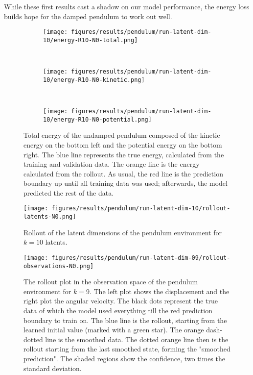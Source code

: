 		While these first results cast a shadow on our model performance, the energy loss builds hope for the damped pendulum to work out well.

		\begin{figure}
			\centering
			\begin{subfigure}{0.7\linewidth}
				\texttt{[image: figures/results/pendulum/run-latent-dim-10/energy-R10-N0-total.png]}
			\end{subfigure} \\
			\begin{subfigure}{0.5\linewidth}
				\centering
				\texttt{[image: figures/results/pendulum/run-latent-dim-10/energy-R10-N0-kinetic.png]}
			\end{subfigure}%
			~
			\begin{subfigure}{0.5\linewidth}
				\centering
				\texttt{[image: figures/results/pendulum/run-latent-dim-10/energy-R10-N0-potential.png]}
			\end{subfigure}
			\caption[Total energy of the undamped pendulum]{Total energy of the undamped pendulum composed of the kinetic energy on the bottom left and the potential energy on the bottom right. The blue line represents the true energy, calculated from the training and validation data. The orange line is the energy calculated from the rollout. As usual, the red line is the prediction boundary up until all training data was used; afterwards, the model predicted the rest of the data.}
			\label{fig:pendulumEnergyL10}
		\end{figure}

		\begin{figure}
			\centering
			\texttt{[image: figures/results/pendulum/run-latent-dim-10/rollout-latents-N0.png]}
			\caption[Latent rollout of the pendulum experiment for 10 latent dimensions]{Rollout of the latent dimensions of the pendulum environment for \(k = 10 \) latents.}
			\label{fig:pendulumLatentRolloutL10}
		\end{figure}

		\begin{figure}
			\centering
			\texttt{[image: figures/results/pendulum/run-latent-dim-09/rollout-observations-N0.png]}
			\caption[Rollout of the pendulum experiment for 9 latent dimensions]{The rollout plot in the observation space of the pendulum environment for \(k = 9\). The left plot shows the displacement and the right plot the angular velocity. The black dots represent the true data of which the model used everything till the red prediction boundary to train on. The blue line is the rollout, starting from the learned initial value (marked with a green star). The orange dash-dotted line is the smoothed data. The dotted orange line then is the rollout starting from the last smoothed state, forming the "smoothed prediction". The shaded regions show the confidence, \ie two times the standard deviation.}
			\label{fig:pendulumRolloutL09}
		\end{figure}

